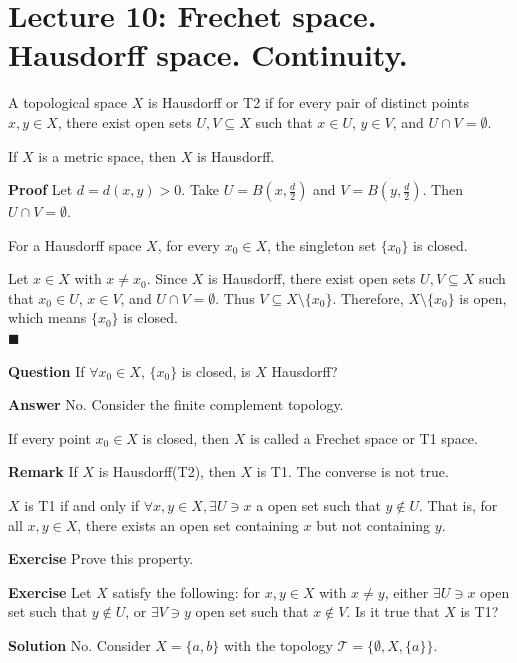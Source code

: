 \documentclass[main.tex]{subfiles}
\begin{document}
\pagestyle{plain}
\setcounter{chapter}{9}

\chapter{Lecture 10: Frechet space. Hausdorff space. Continuity. }
\label{chap:Lecture10}

\begin{definition}
    A topological space $X$ is Hausdorff or T2 if for every pair of distinct points $x, y \in X$, there exist open sets $U, V \subseteq X$ such that $x \in U$, $y \in V$, and $U \cap V = \emptyset$.
\end{definition}

\begin{property}
    If $X$ is a metric space, then $X$ is Hausdorff.
\end{property}
\par \noindent \textbf{Proof} Let $d = d(x, y) > 0$. Take $U = B\left(x, \frac{d}{2}\right)$ and $V = B\left(y, \frac{d}{2}\right)$. Then $U \cap V = \emptyset$.

\begin{property}
    For a Hausdorff space $X$, for every $x_0\in X$, the singleton set $\{ x_0 \}$ is closed. 
\end{property}
\par Let $x\in X $ with $x \neq x_0$. Since $X$ is Hausdorff, there exist open sets $U, V \subseteq X$ such that $x_0 \in U$, $x \in V$, and $U \cap V = \emptyset$. Thus $V \subseteq X \setminus \{ x_0 \}$. Therefore, $X \setminus \{ x_0 \}$ is open, which means $\{ x_0 \}$ is closed.
\mbox{} \\ \null \hfill $\blacksquare$ 

\par \noindent \textbf{Question} If $\forall x_0 \in X$, $\{ x_0 \}$ is closed, is $X$ Hausdorff? 
\par \noindent \textbf{Answer} No. Consider the finite complement topology. 
\begin{definition}
    If every point $x_0\in X$ is closed, then $X$ is called a Frechet space or T1 space.
\end{definition}
\par \noindent \textbf{Remark} If $X$ is Hausdorff(T2), then $X$ is T1. The converse is not true. 
\begin{property}
    $X$ is T1 if and only if $\forall x, y\in X, \exists U\ni x$ a open set such that $y \notin U$. That is, for all $x, y\in X$, there exists an open set containing $x$ but not containing $y$.
\end{property}
\par \noindent \textbf{Exercise} Prove this property. 
\par \noindent \textbf{Exercise} Let $X$ satisfy the following: for $x, y\in X$ with $x \neq y$, either $\exists U \ni x$ open set such that $y \notin U$, or $\exists V \ni y$ open set such that $x \notin V$. Is it true that $X$ is T1? 
\par \noindent \textbf{Solution} No. Consider $X = \{a, b\}$ with the topology $\mathcal{T} = \{\emptyset, X, \{a\}\}$. 
\end{document}
